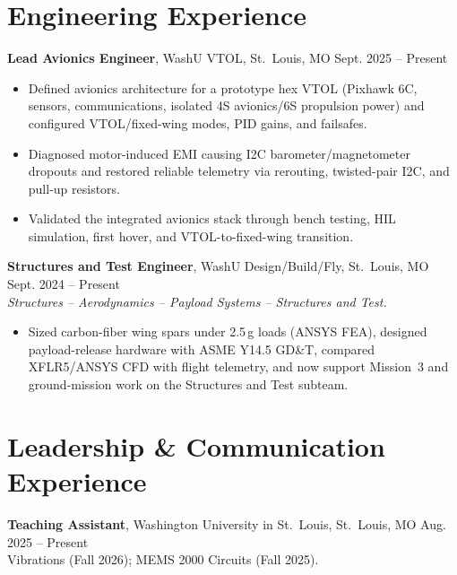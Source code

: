 \documentclass[11pt, letterpaper]{article}
\newcommand{\role}[5]{%
  \noindent\textbf{#1}, #2, #3, #4 \hfill #5%
}
\begin{document}
\section{Engineering Experience}
\role{Lead Avionics Engineer}{WashU VTOL}{St.\ Louis}{MO}{Sept. 2025 -- Present}
\begin{itemize}
\item Defined avionics architecture for a prototype hex VTOL (Pixhawk 6C, sensors, communications, isolated 4S avionics/6S propulsion power) and configured VTOL/fixed-wing modes, PID gains, and failsafes.
\item Diagnosed motor-induced EMI causing I2C barometer/magnetometer dropouts and restored reliable telemetry via rerouting, twisted-pair I2C, and pull-up resistors.
\item Validated the integrated avionics stack through bench testing, HIL simulation, first hover, and VTOL-to-fixed-wing transition.
\end{itemize}
\role{Structures and Test Engineer}{WashU Design/Build/Fly}{St.\ Louis}{MO}{Sept. 2024 -- Present} \\[-2pt]
\textit{\small Structures -- Aerodynamics -- Payload Systems -- Structures and Test.}
\begin{itemize}
\item Sized carbon-fiber wing spars under 2.5\,g loads (ANSYS FEA), designed payload-release hardware with ASME Y14.5 GD\&T, compared XFLR5/ANSYS CFD with flight telemetry, and now support Mission~3 and ground-mission work on the Structures and Test subteam.
\end{itemize}
\section{Leadership \& Communication Experience}
\role{Teaching Assistant}{Washington University in St.\ Louis}{St.\ Louis}{MO}{Aug. 2025 -- Present}\\[-1pt]
{\small Vibrations (Fall 2026); MEMS 2000 Circuits (Fall 2025).}
\end{document}

